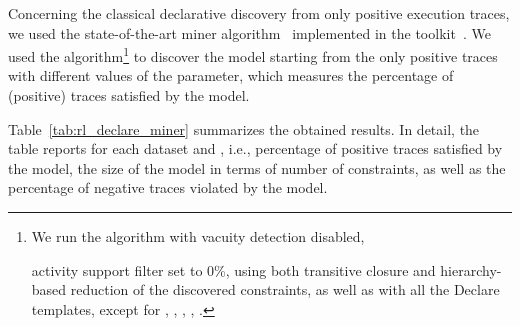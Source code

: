 Concerning the classical declarative discovery from only positive execution traces, we used the state-of-the-art \declare miner algorithm~\cite{2018a-Maggi} implemented in the \rum toolkit~\cite{2020-Alman}. We used the \declareminer algorithm\footnote{We run the \declareminer algorithm with vacuity detection disabled, \par{activity support filter} set to 0\%, using both transitive closure and hierarchy-based reduction of the discovered constraints, as well as with all the Declare templates, except for , , , , .} to discover the \declare model starting from the only positive traces with different values of the  parameter, which measures the percentage of (positive) traces satisfied by the \declare model.  

Table~\ref{tab:rl_declare_miner} summarizes the obtained results. In detail, the table reports for each dataset and , i.e., percentage of positive traces satisfied by the model, the size of the model in terms of number of constraints, as well as the percentage of negative traces violated by the model.

\begin{table} [h]
	\centering
		\caption{\declareminer results}
		\label{tab:rl_declare_miner}
\end{table}

